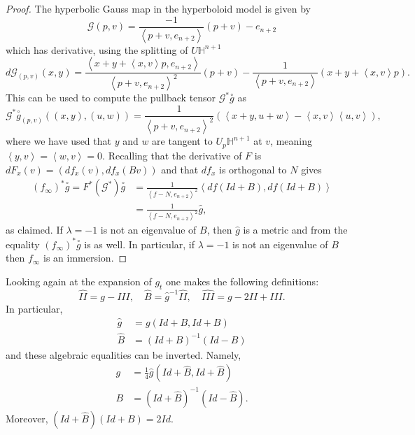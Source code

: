 \documentclass{amsart}
\newcommand{\two}{I\!\!I}
\newcommand{\three}{I\!\!I\!\!I}
\renewcommand{\H}{\mathbb{H}}
\begin{document}
\begin{proof}
The hyperbolic Gauss map in the hyperboloid model is given by 
\[
\mathcal{G}(p,v) = \frac{-1}{\left< p + v, e_{n+2} \right>} (p + v) - e_{n+2}
\]
which has derivative, using the splitting of $U\H^{n+1}$
\[
d\mathcal{G}_{(p,v)}(x,y) = 
\frac{\left< x + y + \left<x,v\right>p, e_{n+2} \right>}{\left< p + v, e_{n+2} \right>^2}(p+v) - \frac{1}{\left< p + v, e_{n+2} \right>}(x + y + \left<x,v\right>p).
\]
This can be used to compute the pullback tensor $\mathcal{G}^*\overset{\circ}{g}$ as
\[
\mathcal{G}^*\overset{\circ}{g}_{(p,v)}((x,y),(u,w))
= \frac{1}{\left< p+v, e_{n+2}\right>^2}\left( \left<x+y,u+w\right> - \left<x,v\right>\left<u,v\right>\right),
\]
where we have used that $y$ and $w$ are tangent to $U_p\H^{n+1}$ at $v$, meaning $\left<y,v\right> = \left<w,v\right> =0$.
Recalling that the derivative of $F$ is $dF_x(v) = (df_x(v),df_x(Bv))$ and that $df_x$ is orthogonal to $N$ gives 
\begin{align*}
(f_\infty)^*\overset{\circ}{g} = F^*(\mathcal{G}^*)\overset{\circ}{g}
&=\frac{1}{\left< f - N , e_{n+2}\right>^2} \left< df(Id + B),df(Id + B)\right> \\
&= \frac{1}{\left< f - N , e_{n+2}\right>^2} \hat{g},
\end{align*}
as claimed.
If $\lambda = -1$ is not an eigenvalue of $B$, then $\hat{g}$ is a metric and from the equality $(f_\infty)^*\overset{\circ}{g}$ is as well. In particular, if $\lambda =-1$ is not an eigenvalue of $B$ then $f_\infty$ is an immersion.
\end{proof}



Looking again at the expansion of $g_t$ one makes the following definitions:
\[
\hat{\two} = g - \three, \quad \hat{B} = \hat{g}^{-1}\hat{\two}, \quad \hat{\three} = g - 2\two + \three.
\]
In particular,
\begin{equation}
\label{TensorsAtInfinity}
\begin{aligned}
\hat{g} &= g(Id+B, Id + B) \\
\hat{B} &= (Id + B)^{-1}(Id-B)
\end{aligned}
\end{equation}
and these algebraic equalities can be inverted. Namely,
\begin{equation}
\label{Tensors}
\begin{aligned} 
g &= \frac{1}{4}\hat{g}(Id + \hat{B}, Id + \hat{B}) \\
B &= (Id + \hat{B})^{-1}(Id - \hat{B}).
\end{aligned}
\end{equation}
Moreover, $(Id + \hat{B})(Id + B) = 2Id$.
\end{document}
